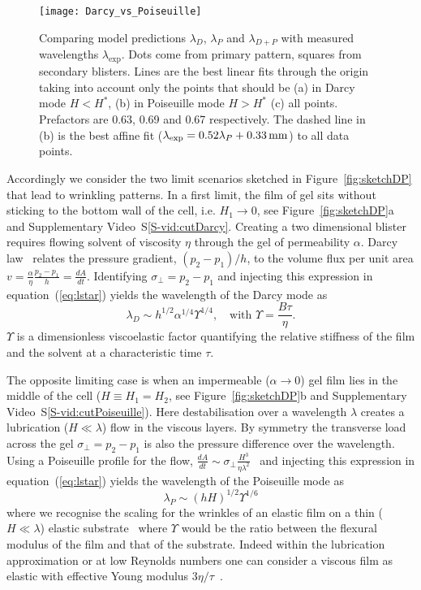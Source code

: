 \documentclass[twocolumn,superscriptaddress,showpacs,preprintnumbers, amsmath,amssymb,prl]{revtex4-1}
\begin{document}
\begin{figure*}
	\texttt{[image: Darcy\_vs\_Poiseuille]}
	\caption{Comparing model predictions $\lambda_D$, $\lambda_P$ and $\lambda_{D+P}$ with measured wavelengths $\lambda_\text{exp}$. Dots come from primary pattern, squares from secondary blisters. Lines are the best linear fits through the origin taking into account only the points that should be (a) in Darcy mode $H<H^*$, (b) in Poiseuille mode $H>H^*$ (c) all points. Prefactors are 0.63, 0.69 and 0.67 respectively. The dashed line in (b) is the best affine fit ($\lambda_{\rm exp}=0.52\lambda_{P}+\SI{0.33}{\milli\metre}$) to all data points.}
	\label{fig:DarcyPoiseuille}
\end{figure*}

Accordingly we consider the two limit scenarios sketched in Figure~\ref{fig:sketchDP} that lead to wrinkling patterns. In a first limit, the film of gel sits without sticking to the bottom wall of the cell, i.e. $H_1\rightarrow0$, see Figure~\ref{fig:sketchDP}a and Supplementary Video~S\ref{S-vid:cutDarcy}. Creating a two dimensional blister requires flowing solvent of viscosity $\eta$ through the gel of permeability $\alpha$. Darcy law~\cite{Darcy1856} relates the pressure gradient, $(p_2-p_1)/h$, to the volume flux per unit area $v = \frac{\alpha}{\eta}\frac{p_2-p_1}{h} = \frac{dA}{dt}$. Identifying $\sigma_{\perp}=p_2-p_1$ and injecting this expression in equation~(\ref{eq:lstar}) yields the wavelength of the Darcy mode as
\begin{equation}
\lambda_D \sim h^{1/2} \alpha^{1/4} \Upsilon^{1/4},\quad\text{with } \Upsilon = \frac{B\tau}{\eta}.
\end{equation}
$\Upsilon$ is a dimensionless viscoelastic factor quantifying the relative stiffness of the film and the solvent at a characteristic time $\tau$. 

The opposite limiting case is when an impermeable ($\alpha\rightarrow 0$) gel film lies in the middle of the cell ($H\equiv H_1=H_2$, see Figure~\ref{fig:sketchDP}b and Supplementary Video~S\ref{S-vid:cutPoiseuille}). Here destabilisation over a wavelength $\lambda$ creates a lubrication ($H\ll\lambda$) flow in the viscous layers. By symmetry the transverse load across the gel $\sigma_{\perp}=p_2-p_1$ is also the pressure difference over the wavelength. Using a Poiseuille profile for the flow, $\frac{dA}{dt} \sim \sigma_{\perp} \frac{H^3}{\eta\lambda^2}$~\cite{Poiseuille1842} and injecting this expression in equation~(\ref{eq:lstar}) yields the wavelength of the Poiseuille mode as
\begin{equation}
\lambda_P \sim (hH)^{1/2} \Upsilon^{1/6}
\end{equation}
where we recognise the scaling for the wrinkles of an elastic film on a thin ($H\ll\lambda$) elastic substrate~\cite{Cerda2003} where $\Upsilon$ would be the ratio between the flexural modulus of the film and that of the substrate. Indeed within the lubrication approximation or at low Reynolds numbers one can consider a viscous film as elastic with effective Young modulus $3\eta/\tau$~\cite{Biot1957,Boudaoud2001}.
\end{document}
